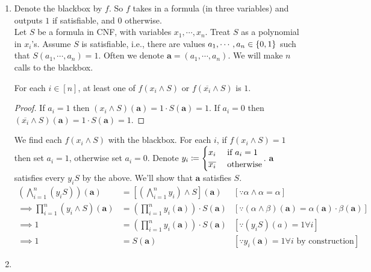 \soln

\begin{enumerate}[leftmargin=*]
\item Denote the blackbox by $f$. So $f$ takes in a formula (in three variables) and outputs $1$ if satisfiable, and $0$ otherwise. \\
Let $S$ be a formula in CNF, with variables $x_{1},\cdots,x_{n}$. Treat $S$ as a polynomial in $x_{i}$'s. Assume $S$ is satisfiable, i.e., there are values $a_{1},\cdots,a_{n}\in\left\{0,1\right\}$ such that $S(a_{1},\cdots,a_{n})=1$. Often we denote $\pmb a = (a_{1},\cdots,a_{n})$. We will make $n$ calls to the blackbox.
\begin{cl}
For each $i\in[n]$, at least one of $f(x_{i}\land S)$ or $f(\overline{x_{i}}\land S)$ is $1$.
\end{cl}
\begin{proof}
If $a_{i}=1$ then $\left(x_{i}\land S\right)(\pmb a) = 1\cdot S(\pmb a) = 1$. 
If $a_{i}=0$ then $\left(\overline{x_{i}}\land S\right)(\pmb a) = 1\cdot S(\pmb a) = 1$.\end{proof}

We find each $f(x_{i}\land S)$ with the blackbox. For each $i$, if $f(x_{i}\land S) = 1$ then set $a_{i}=1$, otherwise set $a_{i}=0$. Denote $y_{i} \coloneqq \begin{cases}x_{i}&\text{ if }a_{i}=1\\\overline{x_{i}}&\text{ otherwise}\end{cases}$. $\pmb a$ satisfies every $y_{i}S$ by the above. We'll show that $\pmb a$ satisfies $S$. 
\begin{align*}\left(\bigwedge_{i=1}^{n}(y_{i}S)\right)(\pmb a) &= \left[\left(\bigwedge_{i=1}^{n}y_{i}\right) \land S\right](\pmb a)&[\because \alpha\land \alpha = \alpha]\\
\implies \prod_{i=1}^{n}(y_{i}\land S)(\pmb a) &= \left(\prod_{i=1}^{n}y_{i}(\pmb a)\right) \cdot S(\pmb a) &[\because(\alpha\land \beta)(\pmb a) = \alpha(\pmb a)\cdot\beta(\pmb a)]\\
\implies 1 &= \left(\prod_{i=1}^{n}y_{i}(\pmb a)\right) \cdot S(\pmb a) &[\because(y_{i}S)(a) = 1\forall i]\\
\implies 1 &=  S(\pmb a) &[\because y_{i}(\pmb a) = 1\forall i \text{ by construction}]
\end{align*}
\item 
\end{enumerate}


\newpage

\pb

